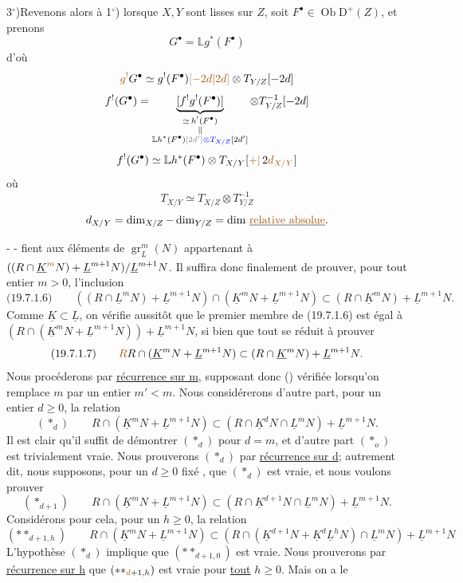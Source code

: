 3$^\circ$)\quad Revenons alors à 1$^\circ$) lorsque $X,Y$
sont lisses sur $Z$, soit $F^\bullet\in\operatorname{Ob}\mathrm D^+(Z)$,
et prenons 
\[
G^\bullet=\mathbb{L}g^*(F^\bullet)
\]
d'où 
\[
\deleted{\unsure{g^!}}G^\bullet\simeq g^!(F^\bullet)\deleted{[\unsure{-2d|2d}]}
 \otimes T_{Y/Z}[-2d]
\]
\[
f^!(G^\bullet)=
 \underbrace{[f^!g^!(F^\bullet)]}_{\substack{
  \simeq\,h^!(F^\bullet)\\
  \Vert\\\mathbb{L}h^*(F^\bullet)\deleted{[2d']}\inserted{\otimes T_{X/Z}}[2d']}}
 \otimes T_{Y/Z}^{-1}[-2d]
\]
\[
f^!(G^\bullet)\simeq \mathbb{L}h^*(F^\bullet)\otimes T_{X/Y}
 [\unsure{+|\,}2\unsure{d_{X/Y}}]
\]
où
\[
T_{X/Y}\simeq T_{X/Z}\otimes T_{Y/Z}^{-1}
\]
\[
d_{X/Y}=\dim_{X/Z}-\dim_{Y/Z}
 =\text{dim \uline{\unsure{relative absolue}}}.
\]

-  -
fient aux éléments de $\operatorname{gr}_{\underline L}^m(N)$ appartenant à
$((R\cap\underline K^{\unsure{m}}N)+\underline L^{m+1}N)/\underline L^{m+1}N$. Il
suffira donc finalement de prouver, pour tout entier $m>0$, l'inclusion
\[
\text{(19.7.1.6)}\qquad
((R\cap\underline L^mN)+\underline L^{m+1}N)
 \cap(\underline K^mN+\underline L^{m+1}N)
 \subset(R\cap\underline K^mN)+\underline L^{m+1}N.
\]
Comme $\underline K\subset\underline L$, on vérifie aussitôt que le premier membre de (19.7.1.6)
est égal à $(R\cap(\underline K^mN+\underline L^{m+1}N))+\underline L^{m+1}N$,
si bien que tout se réduit à prouver
\[
\text{(19.7.1.7)}\qquad
\deleted{\unsure{R}}
R\cap(\underline K^mN+\underline L^{m+1}N)
 \subset(R\cap\underline K^mN)+\underline L^{m+1}N.
\]
Nous procéderons par \uline{récurrence sur m}, supposant donc () vérifiée
lorsqu'on remplace $m$ par un entier $m'<m$. Nous considérerons d'autre part,
pour  un entier $d\geq0$, la relation
\[
(*_d)\qquad
R\cap(\underline K^mN+\underline L^{m+1}N)
 \subset(R\cap\underline K^dN\cap\underline L^mN)+\underline L^{m+1}N.
\]
 Il est clair qu'il suffit de démontrer $(*_d)$ pour $d=m$, et d'autre
part $(*_o)$ est trivialement vraie. Nous prouverons $(*_d)$ par \uline{récurrence sur d};
autrement dit, nous supposons, pour un $d\geq0$ fixé , que $(*_d)$
est vraie, et nous voulons prouver
\[
(*_{d+1})\qquad
R\cap(\underline K^mN+\underline L^{m+1}N)
 \subset(R\cap\underline K^{d+1}N\cap\underline L^mN)+\underline L^{m+1}N.
\]
Considérons pour cela, pour un $h\geq0$, la relation
\[
(**_{d+1,h})\qquad
R\cap(\underline K^mN+\underline L^{m+1}N)
 \subset(R\cap(\underline K^{d+1}N+\underline K^d\underline L^hN)
 \cap\underline L^mN)+\underline L^{m+1}N
\]
L'hypothèse $(*_d)$ implique que $(**_{d+1,0})$ est vraie. Nous prouverons
par \uline{récurrence sur h} que $(**_{\unsure{d}+1,h})$ est vraie pour \uline{tout} $h\geq0$.
Mais 
on a le


